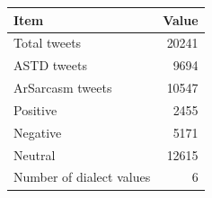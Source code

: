 \begin{tabular}{lr}
\toprule
Item & Value \\
\midrule
Total tweets & 20241 \\
ASTD tweets & 9694 \\
ArSarcasm tweets & 10547 \\
Positive & 2455 \\
Negative & 5171 \\
Neutral & 12615 \\
Number of dialect values & 6 \\
\bottomrule
\end{tabular}
